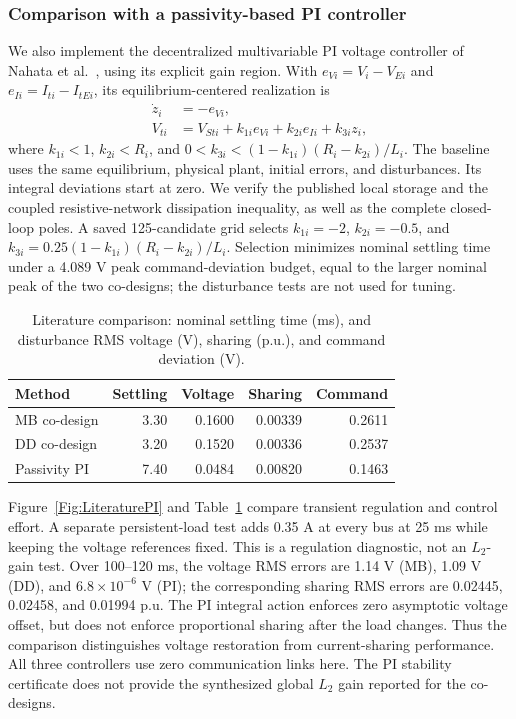\subsubsection{Comparison with a passivity-based PI controller}
We also implement the decentralized multivariable PI voltage controller of Nahata et al.~\cite{Nahata2020}, using its explicit gain region. With $e_{Vi}=V_i-V_{Ei}$ and $e_{Ii}=I_{ti}-I_{tEi}$, its equilibrium-centered realization is
\begin{align}\dot z_i&=-e_{Vi},\nonumber\\ V_{ti}&=V_{Sti}+k_{1i}e_{Vi}+k_{2i}e_{Ii}+k_{3i}z_i,\label{Eq:LiteraturePI}\end{align}
where $k_{1i}<1$, $k_{2i}<R_i$, and $0<k_{3i}<(1-k_{1i})(R_i-k_{2i})/L_i$. The baseline uses the same equilibrium, physical plant, initial errors, and disturbances. Its integral deviations start at zero. We verify the published local storage and the coupled resistive-network dissipation inequality, as well as the complete closed-loop poles.
A saved 125-candidate grid selects $k_{1i}=-2$, $k_{2i}=-0.5$, and $k_{3i}=0.25(1-k_{1i})(R_i-k_{2i})/L_i$. Selection minimizes nominal settling time under a 4.089 V peak command-deviation budget, equal to the larger nominal peak of the two co-designs; the disturbance tests are not used for tuning.
\begin{table}[t]\centering\small\caption{Literature comparison: nominal settling time (ms), and disturbance RMS voltage (V), sharing (p.u.), and command deviation (V).}\label{Tab:LiteraturePI}\begin{tabular}{lrrrr}\hline Method & Settling & Voltage & Sharing & Command\\\hline
MB co-design & 3.30 & 0.1600 & 0.00339 & 0.2611 \\
DD co-design & 3.20 & 0.1520 & 0.00336 & 0.2537 \\
Passivity PI & 7.40 & 0.0484 & 0.00820 & 0.1463 \\
\hline\end{tabular}\end{table}
Figure~\ref{Fig:LiteraturePI} and Table~\ref{Tab:LiteraturePI} compare transient regulation and control effort. A separate persistent-load test adds 0.35 A at every bus at 25 ms while keeping the voltage references fixed. This is a regulation diagnostic, not an $L_2$-gain test.
Over 100--120 ms, the voltage RMS errors are 1.14 V (MB), 1.09 V (DD), and $6.8\times10^{-6}$ V (PI); the corresponding sharing RMS errors are 0.02445, 0.02458, and 0.01994 p.u. The PI integral action enforces zero asymptotic voltage offset, but does not enforce proportional sharing after the load changes. Thus the comparison distinguishes voltage restoration from current-sharing performance. All three controllers use zero communication links here. The PI stability certificate does not provide the synthesized global $L_2$ gain reported for the co-designs.
